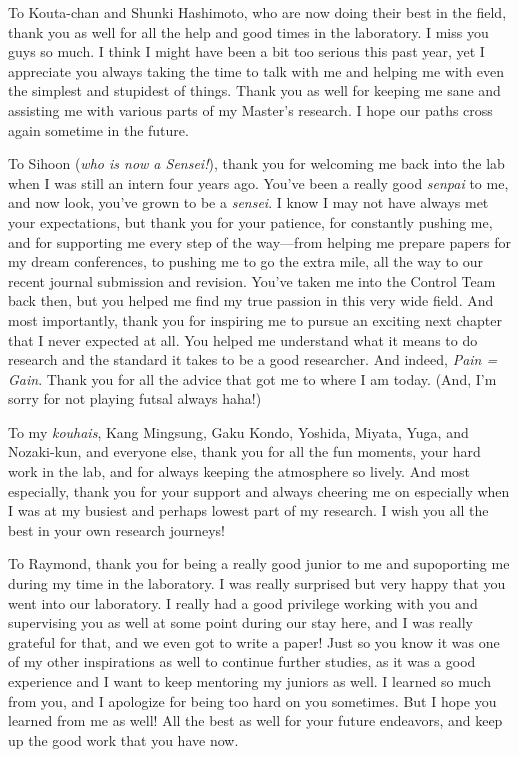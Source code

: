 \par To Kouta-chan and Shunki Hashimoto, who are now doing their best in the field, thank you as well for all the help and good times in the laboratory. I miss you guys so much. I think I might have been a bit too serious this past year, yet I appreciate you always taking the time to talk with me and helping me with even the simplest and stupidest of things. Thank you as well for keeping me sane and assisting me with various parts of my Master's research. I hope our paths cross again sometime in the future.  

\par To Sihoon (\textit{who is now a Sensei!}), thank you for welcoming me back into the lab when I was still an intern four years ago. You've been a really good \textit{senpai} to me, and now look, you've grown to be a \textit{sensei}. I know I may not have always met your expectations, but thank you for your patience, for constantly pushing me, and for supporting me every step of the way—from helping me prepare papers for my dream conferences, to pushing me to go the extra mile, all the way to our recent journal submission and revision. You've taken me into the Control Team back then, but you helped me find my true passion in this very wide field. And most importantly, thank you for inspiring me to pursue an exciting next chapter that I never expected at all. You helped me understand what it means to do research and the standard it takes to be a good researcher. And indeed, \textit{Pain = Gain}. Thank you for all the advice that got me to where I am today. (And, I'm sorry for not playing futsal always haha!)

\par To my \textit{kouhais}, Kang Mingsung, Gaku Kondo, Yoshida, Miyata, Yuga, and Nozaki-kun, and everyone else, thank you for all the fun moments, your hard work in the lab, and for always keeping the atmosphere so lively. And most especially, thank you for your support and always cheering me on especially when I was at my busiest and perhaps lowest part of my research. I wish you all the best in your own research journeys! 
\par To Raymond, thank you for being a really good junior to me and supoporting me during my time in the laboratory. I was really surprised but very happy that you went into our laboratory. I really had a good privilege working with you and supervising you as well at some point during our stay here, and I was really grateful for that, and we even got to write a paper! Just so you know it was one of my other inspirations as well to continue further studies, as it was a good experience and I want to keep mentoring my juniors as well. I learned so much from you, and I apologize for being too hard on you sometimes. But I hope you learned from me as well! All the best as well for your future endeavors, and keep up the good work that you have now.

